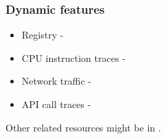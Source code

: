 \subsubsection{Dynamic features}
\begin{itemize}
  \item Registry - \cite{Ghiasi2015}
  \item CPU instruction traces - \cite{Carlin2017}
  \item Network traffic - \cite{Boukhtouta2015}
  \item API call traces -  \cite{Galal2015}
\end{itemize}

Other related resources might be in \cite{Singh2020, Sethi2019, Abdessadki2019, Gibert2020}.









